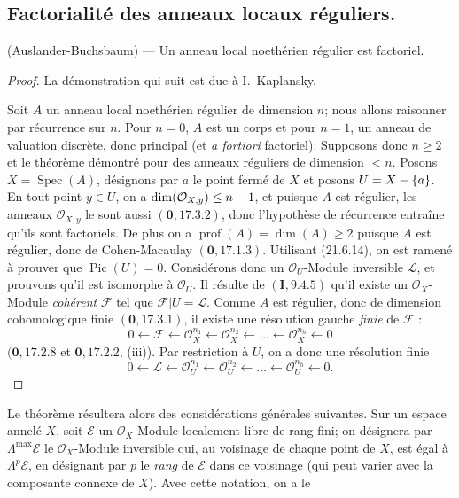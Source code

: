 \subsection{Factorialité des anneaux locaux réguliers.}
\label{IV.21.11}

\begin{theorem}[21.11.1]
\label{IV.21.11.1}
\textup{(Auslander-Buchsbaum)} ---
Un anneau local noethérien régulier est factoriel.
\end{theorem}

\begin{proof}
La démonstration qui suit est due à I.~Kaplansky.

Soit $A$ un anneau local noethérien régulier de dimension $n$; nous allons raisonner
par récurrence sur $n$. Pour $n=0$, $A$ est un corps et pour $n=1$, un anneau de
valuation discrète, donc principal (et \emph{a fortiori} factoriel). Supposons donc
$n\geq2$ et le théorème démontré pour des anneaux réguliers de dimension $<n$.
Posons $X=\operatorname{Spec}(A)$, désignons par $a$ le point fermé de $X$ et posons
$U=X-\{a\}$. En tout point $y\in U$, on a
$\dim(\mathcal O_{X,y})\leq n- 1$, et puisque $A$ est régulier, les anneaux
$\mathcal O_{X,y}$ le sont aussi $(\mathbf 0, 17.3.2)$, donc l'hypothèse de
récurrence entraîne qu'ils sont factoriels. De plus on a
$\operatorname{prof}(A)=\dim(A)\geq2$ puisque $A$ est régulier, donc de
Cohen-Macaulay $(\mathbf 0, 17.1.3)$.
Utilisant (21.6.14), on est ramené à prouver que $\operatorname{Pic}(U)=0$.
Considérons donc un $\mathcal O_U$-Module inversible $\mathscr L$, et prouvons qu'il
est isomorphe à $\mathcal O_U$. Il résulte de $(\mathbf I, 9.4.5)$ qu'il existe un
$\mathcal O_X$-Module \emph{cohérent} $\mathscr F$ tel que
$\mathscr F|U=\mathscr L$. Comme $A$ est régulier, donc de dimension cohomologique
finie $(\mathbf 0, 17.3.1)$, il existe une résolution gauche \emph{finie} de
$\mathscr F$ :
\[
  0\leftarrow\mathscr F\leftarrow\mathcal O_X^{n_1}
  \leftarrow\mathcal O_X^{n_2}\leftarrow\ldots
  \leftarrow\mathcal O_X^{n_h}\leftarrow0
\]
$(\mathbf 0, 17.2.8$ et $\mathbf 0, 17.2.2$, (iii)). Par restriction à $U$, on a
donc une résolution finie
\[
\label{IV.21.11.1.1}
  0\leftarrow\mathscr L\leftarrow\mathcal O_U^{n_1}
  \leftarrow\mathcal O_U^{n_2}\leftarrow\ldots
  \leftarrow\mathcal O_U^{n_h}\leftarrow0.
  \tag{21.11.1.1}
\]
\end{proof}

Le théorème résultera alors des considérations générales suivantes. Sur un espace
annelé $X$, soit $\mathscr E$ un $\mathcal O_X$-Module localement libre de rang fini;
on désignera par $\Lambda^{\max}\mathscr E$ le $\mathcal O_X$-Module inversible qui,
au voisinage de chaque point de $X$, est égal à $\Lambda^p\mathscr E$, en désignant
par $p$ le \emph{rang} de $\mathscr E$ dans ce voisinage (qui peut varier avec la composante
connexe de $X$). Avec cette notation, on a le

